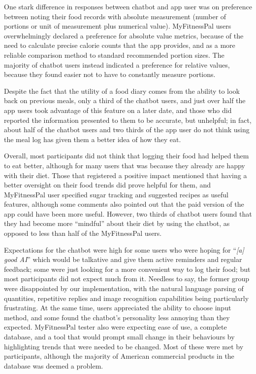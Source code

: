 One stark difference in responses between chatbot and app user was on preference between noting their food records with absolute measurement (number of portions or unit of measurement plus numerical value). MyFitnessPal users overwhelmingly declared a preference for absolute value metrics, because of the need to calculate precise calorie counts that the app provides, and as a more reliable comparison method to standard recommended portion sizes. The majority of chatbot users instead indicated a preference for relative values, because they found easier not to have to constantly measure portions. 

Despite the fact that the utility of a food diary comes from the ability to look back on previous meals, only a third of the chatbot users, and just over half the app users took advantage of this feature on a later date, and those who did reported the information presented to them to be accurate, but unhelpful; in fact, about half of the chatbot users and two thirds of the app user do not think using the meal log has given them a better idea of how they eat. 

Overall, most participants did not think that logging their food had helped them to eat better, although for many users that was because they already are happy with their diet. Those that registered a positive impact mentioned that having a better oversight on their food trends did prove helpful for them, and MyFitnessPal user specified sugar tracking and suggested recipes as useful features, although some comments also pointed out that the paid version of the app could have been more useful. However, two thirds of chatbot users found that they had become more ``mindful'' about their diet by using the chatbot, as opposed to less than half of the MyFitnessPal users. 

Expectations for the chatbot were high for some users who were hoping for ``\textit{[a] good AI}'' which would be talkative and give them active reminders and regular feedback; some were just looking for a more convenient way to log their food; but most participants did not expect much from it. Needless to say, the former group were disappointed by our implementation, with the natural language parsing of quantities, repetitive replies and image recognition capabilities being particularly frustrating. At the same time, users appreciated the ability to choose input method, and some found the chatbot's personality less annoying than they expected. MyFitnessPal tester also were expecting ease of use, a complete database, and a tool that would prompt small change in their behaviours by highlighting trends that were needed to be changed. Most of these were met by participants, although the majority of American commercial products in the database was deemed a problem. 

